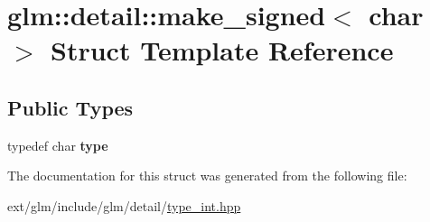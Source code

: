 \hypertarget{structglm_1_1detail_1_1make__signed_3_01char_01_4}{\section{glm\-:\-:detail\-:\-:make\-\_\-signed$<$ char $>$ Struct Template Reference}
\label{structglm_1_1detail_1_1make__signed_3_01char_01_4}
}
\subsection*{Public Types}
\begin{DoxyCompactItemize}
\item 
\hypertarget{structglm_1_1detail_1_1make__signed_3_01char_01_4_ad92111512e0af83393df0905896d478f}{typedef char {\bfseries type}}\label{structglm_1_1detail_1_1make__signed_3_01char_01_4_ad92111512e0af83393df0905896d478f}

\end{DoxyCompactItemize}


The documentation for this struct was generated from the following file\-:\begin{DoxyCompactItemize}
\item 
ext/glm/include/glm/detail/\hyperlink{type__int_8hpp}{type\-\_\-int.\-hpp}\end{DoxyCompactItemize}
